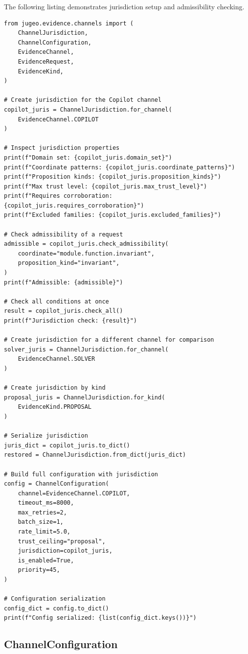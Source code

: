 \documentclass[11pt]{article}
\begin{document}
The following listing demonstrates jurisdiction setup and
admissibility checking.

\begin{lstlisting}[style=jugeo-python, caption={Jurisdiction configuration and admissibility checking.}, label=lst:jurisdiction]
from jugeo.evidence.channels import (
    ChannelJurisdiction,
    ChannelConfiguration,
    EvidenceChannel,
    EvidenceRequest,
    EvidenceKind,
)

# Create jurisdiction for the Copilot channel
copilot_juris = ChannelJurisdiction.for_channel(
    EvidenceChannel.COPILOT
)

# Inspect jurisdiction properties
print(f"Domain set: {copilot_juris.domain_set}")
print(f"Coordinate patterns: {copilot_juris.coordinate_patterns}")
print(f"Proposition kinds: {copilot_juris.proposition_kinds}")
print(f"Max trust level: {copilot_juris.max_trust_level}")
print(f"Requires corroboration: {copilot_juris.requires_corroboration}")
print(f"Excluded families: {copilot_juris.excluded_families}")

# Check admissibility of a request
admissible = copilot_juris.check_admissibility(
    coordinate="module.function.invariant",
    proposition_kind="invariant",
)
print(f"Admissible: {admissible}")

# Check all conditions at once
result = copilot_juris.check_all()
print(f"Jurisdiction check: {result}")

# Create jurisdiction for a different channel for comparison
solver_juris = ChannelJurisdiction.for_channel(
    EvidenceChannel.SOLVER
)

# Create jurisdiction by kind
proposal_juris = ChannelJurisdiction.for_kind(
    EvidenceKind.PROPOSAL
)

# Serialize jurisdiction
juris_dict = copilot_juris.to_dict()
restored = ChannelJurisdiction.from_dict(juris_dict)

# Build full configuration with jurisdiction
config = ChannelConfiguration(
    channel=EvidenceChannel.COPILOT,
    timeout_ms=8000,
    max_retries=2,
    batch_size=1,
    rate_limit=5.0,
    trust_ceiling="proposal",
    jurisdiction=copilot_juris,
    is_enabled=True,
    priority=45,
)

# Configuration serialization
config_dict = config.to_dict()
print(f"Config serialized: {list(config_dict.keys())}")
\end{lstlisting}

\subsection{ChannelConfiguration}
\label{sec:jurisdiction:config}
\end{document}
